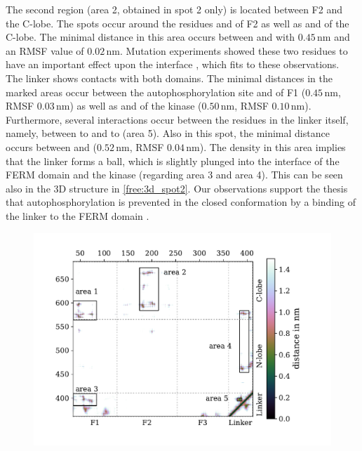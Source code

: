 The second region (area 2, obtained in spot 2 only) is located between F2 and the C-lobe. The spots occur around the residues  and  of F2 as well as  and  of the C-lobe. The minimal distance in this area occurs between  and  with $0.45\,\si{\nano\metre}$ and an RMSF value of $0.02\,\si{\nano\metre}$. Mutation experiments showed these two residues to have an important effect upon the interface \autocite{structFAK}, which fits to these observations.\\
The linker shows contacts with both domains. The minimal distances in the marked areas occur between the autophosphorylation site  and  of F1 ($0.45\,\si{\nano\metre}$, RMSF $0.03\,\si{\nano\metre}$) as well as  and  of the kinase ($0.50\,\si{\nano\metre}$, RMSF $0.10\,\si{\nano\metre}$). Furthermore, several interactions occur between the residues in the linker itself, namely, between  to  and  to  (area 5). Also in this spot, the minimal distance occurs between  and  ($0.52\,\si{\nano\metre}$, RMSF $0.04\,\si{\nano\metre}$). The density in this area implies that the linker forms a ball, which is slightly plunged into the interface of the FERM domain and the kinase (regarding area 3 and area 4). This can be seen also in the 3D structure in \autoref{free:3d_spot2}. Our observations support the thesis that autophosphorylation is prevented in the closed conformation by a binding of the linker to the FERM domain \autocite{pap003}.\\
%
%
\begin{figure}
	\centering
	\includegraphics[width=.8\textwidth]{figures/results/contactmap_free}
	\label{free:contact}
\end{figure}

